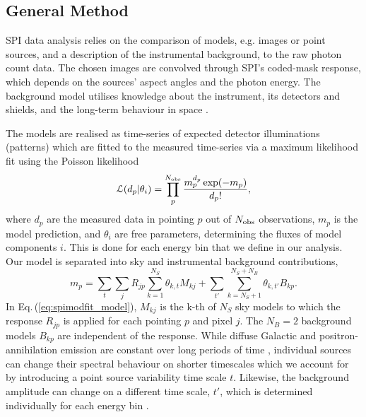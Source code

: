 \documentclass[doublespace,nopageskip]{VTthesis} %
\begin{document}
	
	\subsection{General Method}\label{sec:likelihood_analysis}
	SPI data analysis relies on the comparison of models, e.g. images or point sources, and a description of the instrumental background, to the raw photon count data.
	The chosen images are convolved through SPI's coded-mask response, which depends on the sources' aspect angles and the photon energy.
	The background model utilises knowledge about the instrument, its detectors and shields, and the long-term behaviour in space \citep{Diehl2018_BGRDB,Siegert2019_SPIBG}.
	
	The models are realised as time-series of expected detector illuminations (patterns) which are fitted to the measured time-series via a maximum likelihood fit using the Poisson likelihood
	\begin{equation}
		\mathcal{L}(d_p|\theta_i) = \prod_p^{N_{\rm obs}} \frac{m_p^{d_p} \exp(-m_p)}{d_p!}\mathrm{,}
		\label{eq:cstat}
	\end{equation}
	\noindent where $d_p$ are the measured data in pointing $p$ out of $N_{\rm obs}$ observations, $m_p$ is the model prediction, and $\theta_i$ are free parameters, determining the fluxes of model components $i$.
	This is done for each energy bin that we define in our analysis.
	Our model is separated into sky and instrumental background contributions,
	\begin{equation}
		m_p = \sum_{t} \sum_{j} R_{jp} \sum_{k=1}^{N_S} \theta_{k,t} M_{kj} + \sum_{t'} \sum_{k=N_S+1}^{N_S+N_B} \theta_{k,t'} B_{kp}\mathrm{.}
		\label{eq:spimodfit_model}
	\end{equation}
	\noindent In Eq.\,(\ref{eq:spimodfit_model}), $M_{kj}$ is the k-th of $N_S$ sky models to which the response $R_{jp}$ is applied for each pointing $p$ and pixel $j$.
	The $N_B = 2$ background models $B_{kp}$ are independent of the response.
	While diffuse Galactic and positron-annihilation emission are constant over long periods of time \citep{Purcell1997_511}, individual sources can change their spectral behaviour on shorter timescales which we account for by introducing a point source variability time scale $t$.
	Likewise, the background amplitude can change on a different time scale, $t'$, which is determined individually for each energy bin \citep{Siegert2019_SPIBG}.
	
	
	
\end{document}
